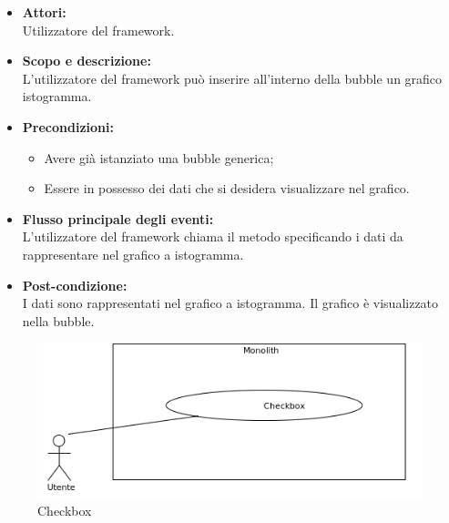 \begin{itemize}
	\item \textbf{Attori:}
	\\Utilizzatore del framework.
	\item \textbf{Scopo e descrizione:} 
	\\L'utilizzatore del framework può inserire all'interno della bubble un grafico istogramma.
	\item \textbf{Precondizioni:}
	\begin{itemize}
		\item Avere già istanziato una bubble generica;
		\item Essere in possesso dei dati che si desidera visualizzare nel grafico.
	\end{itemize}
	\item \textbf{Flusso principale degli eventi:}
	\\L'utilizzatore del framework chiama il metodo specificando i dati da rappresentare nel grafico a istogramma.
	\item \textbf{Post-condizione:}
	\\I dati sono rappresentati nel grafico a istogramma. Il grafico è visualizzato nella bubble.
\end{itemize}


\begin{figure}[H]
	\centering
	\includegraphics[width=15cm]{../../documenti/AnalisiDeiRequisiti/Diagrammi_img/uc1_30.png}
	\caption{\UCFCaption{} Checkbox}
\end{figure}

